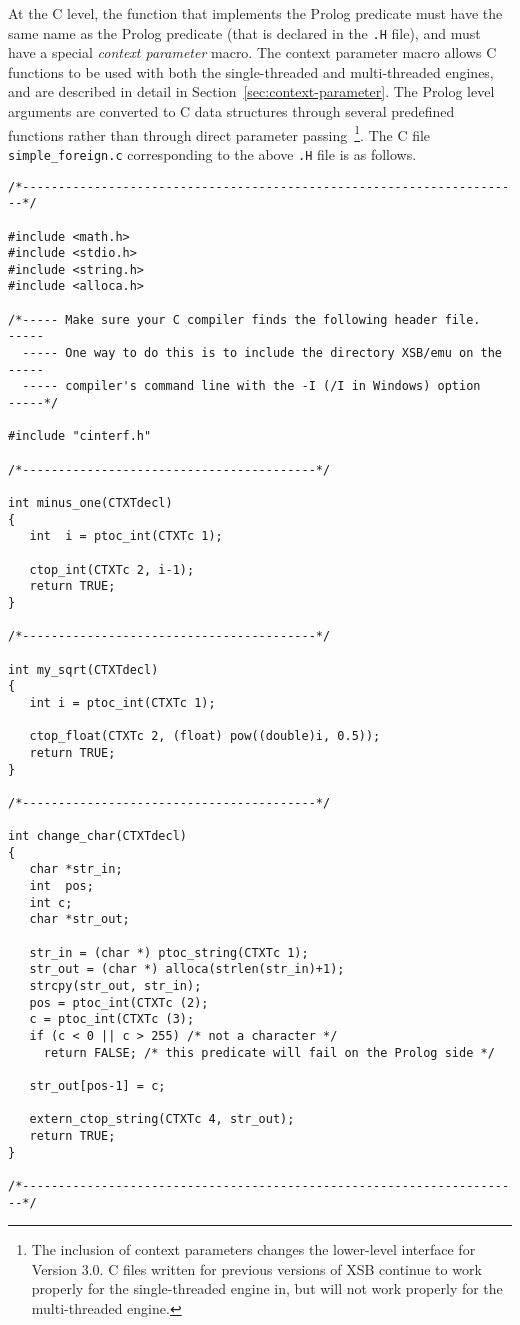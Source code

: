 At the C level, the function that implements the Prolog predicate must
have the same name as the Prolog predicate (that is declared in the
{\tt *.H} file), and must have a special {\em context parameter}
macro.  The context parameter macro allows C functions to be used with
both the single-threaded and multi-threaded engines, and are described
in detail in Section~\ref{sec:context-parameter}.  The Prolog level
arguments are converted to C data structures through several
predefined functions rather than through direct parameter
passing~\footnote{The inclusion of context parameters changes the
  lower-level interface for Version 3.0.  C files written for previous
  versions of XSB continue to work properly for the single-threaded
  engine in, but will not work properly for the multi-threaded
  engine.}.  The C file {\tt simple\_foreign.c} corresponding to the
above {\tt .H} file is as follows.

\begin{small}
\begin{verbatim}
/*----------------------------------------------------------------------*/

#include <math.h>
#include <stdio.h>
#include <string.h>
#include <alloca.h>

/*----- Make sure your C compiler finds the following header file.    -----
  ----- One way to do this is to include the directory XSB/emu on the -----
  ----- compiler's command line with the -I (/I in Windows) option    -----*/

#include "cinterf.h"

/*-----------------------------------------*/

int minus_one(CTXTdecl)
{
   int  i = ptoc_int(CTXTc 1);

   ctop_int(CTXTc 2, i-1);
   return TRUE;
}

/*-----------------------------------------*/

int my_sqrt(CTXTdecl)
{
   int i = ptoc_int(CTXTc 1);

   ctop_float(CTXTc 2, (float) pow((double)i, 0.5));
   return TRUE;
}

/*-----------------------------------------*/

int change_char(CTXTdecl)
{
   char *str_in;
   int  pos;
   int c;
   char *str_out;

   str_in = (char *) ptoc_string(CTXTc 1);
   str_out = (char *) alloca(strlen(str_in)+1);
   strcpy(str_out, str_in);
   pos = ptoc_int(CTXTc (2);
   c = ptoc_int(CTXTc (3);
   if (c < 0 || c > 255) /* not a character */
     return FALSE; /* this predicate will fail on the Prolog side */

   str_out[pos-1] = c;

   extern_ctop_string(CTXTc 4, str_out);  
   return TRUE;
}

/*----------------------------------------------------------------------*/
\end{verbatim}
\end{small}

